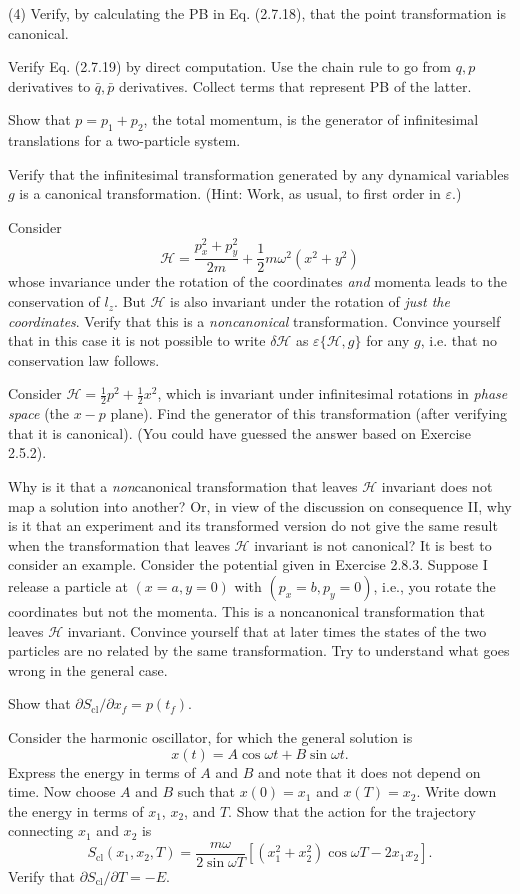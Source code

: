 \documentclass[../principles-of-quantum-mechanics.tex]{subfiles}
\begin{document}
\begin{questions}
		(4) Verify, by calculating the PB in Eq. (2.7.18), that the point transformation is canonical.
		
		\question Verify Eq. (2.7.19) by direct computation. Use the chain rule to go from $q, p$ derivatives to $\bar{q}, \bar{p}$ derivatives. Collect terms that represent PB of the latter.
		
		\question Show that $p = p_1 + p_2$, the total momentum, is the generator of infinitesimal translations for a two-particle system.
		
		\question Verify that the infinitesimal transformation generated by any dynamical variables $g$ is a canonical transformation. (Hint: Work, as usual, to first order in $\varepsilon$.)
		
		\question Consider
		\[
			\mathcal{H} = \frac{p_x^2 + p_y^2}{2m} + \frac{1}{2}m\omega^2(x^2+y^2)
		\]
		whose invariance under the rotation of the coordinates \textit{and} momenta leads to the conservation of $l_z$. But $\mathcal{H}$ is also invariant under the rotation of \textit{just the coordinates}. Verify that this is a \textit{noncanonical} transformation. Convince yourself that in this case it is not possible to write $\delta\mathcal{H}$ as $\varepsilon\{\mathcal{H}, g\}$ for any $g$, i.e. that no conservation law follows.
		
		\question Consider $\mathcal{H} = \frac{1}{2}p^2 + \frac{1}{2}x^2$, which is invariant under infinitesimal rotations in \textit{phase space} (the $x-p$ plane). Find the generator of this transformation (after verifying that it is canonical). (You could have guessed the answer based on Exercise 2.5.2).
		
		\question Why is it that a \textit{non}canonical transformation that leaves $\mathcal{H}$ invariant does not map a solution into another? Or, in view of the discussion on consequence II, why is it that an experiment and its transformed version do not give the same result when the transformation that leaves $\mathcal{H}$ invariant is not canonical? It is best to consider an example. Consider the potential given in Exercise 2.8.3. Suppose I release a particle at $(x = a, y = 0)$ with $(p_x = b, p_y = 0)$, i.e., you rotate the coordinates but not the momenta. This is a noncanonical transformation that leaves $\mathcal{H}$ invariant. Convince yourself that at later times the states of the two particles are no related by the same transformation. Try to understand what goes wrong in the general case.
		
		\question Show that $\partial S_{\text{cl}}/\partial x_f = p(t_f)$.
		
		\question Consider the harmonic oscillator, for which the general solution is
		\[
			x(t) = A\cos\omega t + B\sin\omega t.
		\]
		Express the energy in terms of $A$ and $B$ and note that it does not depend on time. Now choose $A$ and $B$ such that $x(0) = x_1$ and $x(T) = x_2$. Write down the energy in terms of $x_1$, $x_2$, and $T$. Show that the action for the trajectory connecting $x_1$ and $x_2$ is
		\[
			S_{\text{cl}}(x_1, x_2, T) = \frac{m\omega}{2\sin\omega T}[(x_1^2+x_2^2)\cos\omega T - 2x_1x_2].
		\]
		Verify that $\partial S_{\text{cl}}/\partial T = -E$.
	\end{questions}
\end{document}
